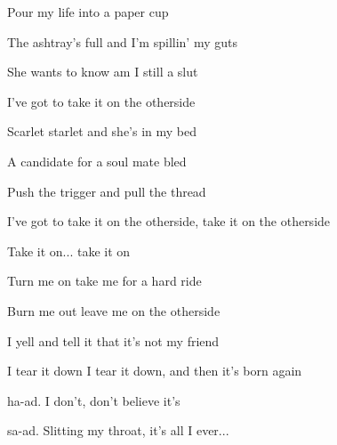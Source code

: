 \begin{song}
\Chorus

\bigskip

 Pour my life into a paper cup \par
{} The ashtray's full and I'm spillin' my guts \par
{} She wants to know am I still a slut \par
I've got to take it on the otherside 

\bigskip

 Scarlet starlet and she's in my bed \par
{} A candidate for a soul mate bled \par
{} Push the trigger and pull the thread \par
I've got to take it on the otherside, take it on the otherside \par
{}Take it on... take it on

\bigskip

\Chorus

\bigskip

   \par
{}   \par

\bigskip

 Turn me on take me for a hard ride \par
{} Burn me out leave me on the otherside \par
{} I yell and tell it that it's not my friend \par
I tear it down I tear it down, and then it's born again 

\bigskip

    \par

\bigskip

\Chorus

\bigskip

ha-ad. I don't, don't believe it's \par
{}sa-ad. Slitting my throat, it's all I ever...  \par

\end{song}
